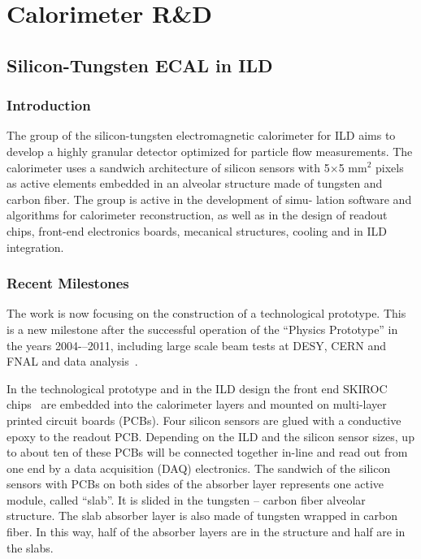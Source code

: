\documentclass{article}
\begin{document}
\date{} 
\section{\bf Calorimeter R\&D}

\subsection{Silicon-Tungsten ECAL in ILD}
\subsubsection{Introduction}

The group of the silicon-tungsten electromagnetic calorimeter for ILD aims to develop a highly
granular detector optimized for particle flow measurements. The calorimeter uses a
sandwich architecture of silicon sensors with 5$\times$5 mm$^2$ pixels as active elements embedded in an
alveolar structure made of tungsten and carbon fiber. The group is active in the development of simu-
lation software and algorithms for calorimeter reconstruction, as well as in the design of readout
chips, front-end electronics boards, mecanical structures, cooling and in ILD 
integration.

\subsubsection{Recent Milestones}

The work is now focusing on the construction of a technological prototype. This
is a new milestone after the successful operation of the “Physics Prototype” in the
years 2004-–2011, including large scale beam tests at DESY, CERN and FNAL and data
analysis~\cite{physprot}.

In the technological prototype and in the ILD design the front end SKIROC
chips~\cite{skiroc} are embedded into the calorimeter layers and mounted on
multi-layer printed circuit boards (PCBs). Four silicon sensors are glued with
a conductive epoxy to the readout PCB. Depending on the ILD and the silicon
sensor sizes, up to about ten of these PCBs will be connected together in-line
and read out from one end by a data acquisition (DAQ) electronics. The sandwich
of the silicon sensors with PCBs on both sides of the absorber layer
represents one active module, called ``slab''. It is slided in the tungsten --
carbon fiber alveolar structure. The slab absorber layer is also made of
tungsten wrapped in carbon fiber. In this way, half of the absorber layers are
in the structure and half are in the slabs.
\end{document}
